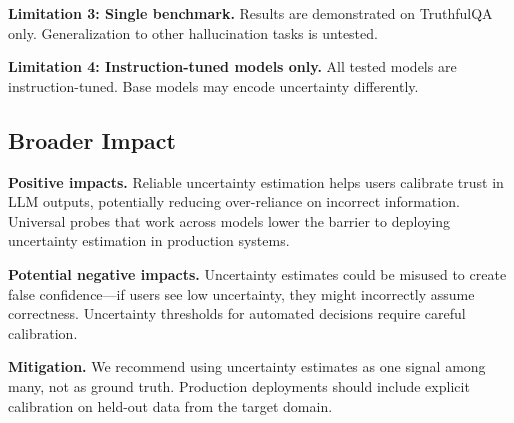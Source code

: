 \textbf{Limitation 3: Single benchmark.} Results are demonstrated on TruthfulQA only. Generalization to other hallucination tasks is untested.

\textbf{Limitation 4: Instruction-tuned models only.} All tested models are instruction-tuned. Base models may encode uncertainty differently.

\subsection{Broader Impact}

\textbf{Positive impacts.} Reliable uncertainty estimation helps users calibrate trust in LLM outputs, potentially reducing over-reliance on incorrect information. Universal probes that work across models lower the barrier to deploying uncertainty estimation in production systems.

\textbf{Potential negative impacts.} Uncertainty estimates could be misused to create false confidence---if users see low uncertainty, they might incorrectly assume correctness. Uncertainty thresholds for automated decisions require careful calibration.

\textbf{Mitigation.} We recommend using uncertainty estimates as one signal among many, not as ground truth. Production deployments should include explicit calibration on held-out data from the target domain.
